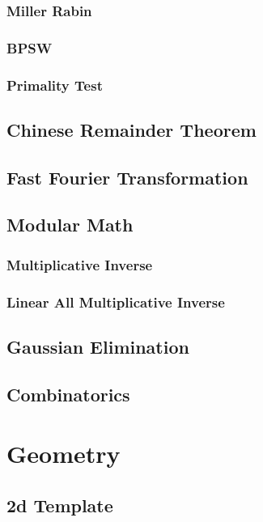 \documentclass[10pt,a4paper]{report}
\begin{document}
		\subsection{Miller Rabin}
		\subsection{BPSW}
		\subsection{Primality Test}
		
	\section{Chinese Remainder Theorem}
	
	\section{Fast Fourier Transformation}
		
	
	\section{Modular Math}
		\subsection{Multiplicative Inverse}
		\subsection{Linear All Multiplicative Inverse}
	
	\section{Gaussian Elimination}
	
	\section{Combinatorics}
	
\chapter{Geometry}
	\section{2d Template}
\end{document}
